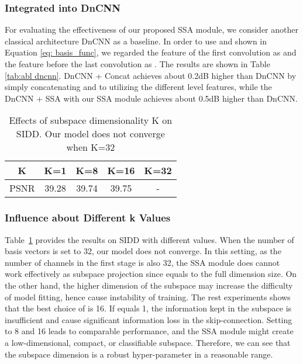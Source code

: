 \documentclass[final]{cvpr}
\begin{document}
\subsubsection{Integrated into DnCNN}
For evaluating the effectiveness of our proposed SSA module, we consider another classical architecture DnCNN as a baseline. In order to use  and  shown in Equation \ref{eq: basis_func},  we regarded the feature of the first convolution as  and the feature before the last convolution as .  The results are shown in Table \ref{tab:abl dncnn}.  DnCNN + Concat achieves about 0.2dB higher than DnCNN by simply concatenating   and  to utilizing the different level features,  while the DnCNN + SSA  with our SSA module achieves about 0.5dB higher than DnCNN.





\begin{table}[t]
   \centering

   \begin{tabular}{c c c c c}
   \toprule
      K & K=1 & K=8 & K=16 & K=32 \\
   \midrule
   PSNR &  39.28 & 39.74 & 39.75 & -\\
   \bottomrule
   \end{tabular}
      \caption{Effects of subspace dimensionality K on SIDD. Our model does not converge when K=32}
    \label{tab:k exps}
\end{table} \subsubsection{Influence about Different k Values}
Table~\ref{tab:k exps} provides the results on SIDD with different  values. 
When the number of basis vectors  is set to 32, our model does not converge. In this 
setting, as the number of channels in the first stage is also 32, the SSA module does
cannot work effectively as subspace projection since  equals to the full dimension size. On the other hand, the higher dimension of the subspace may increase the difficulty of
model fitting, hence cause instability of training.
The rest experiments shows that the best choice of  is 16. If  equals 1, the information kept in the subspace is insufficient and cause significant 
information loss in the skip-connection. 
Setting  to 8 and 16 leads to comparable performance, and the SSA module might create a low-dimensional, compact, or classifiable subspace. Therefore, we can see that the subspace dimension  is a robust hyper-parameter in a reasonable range.
\end{document}
